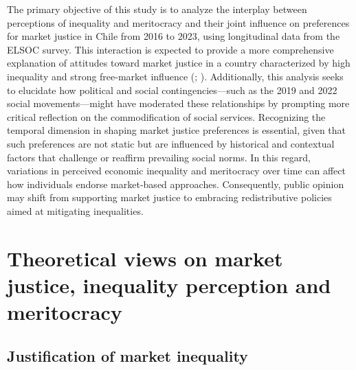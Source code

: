 \documentclass[
  12pt,
]{article}
\begin{document}
The primary objective of this study is to analyze the interplay between
perceptions of inequality and meritocracy and their joint influence on
preferences for market justice in Chile from 2016 to 2023, using
longitudinal data from the ELSOC survey. This interaction is expected to
provide a more comprehensive explanation of attitudes toward market
justice in a country characterized by high inequality and strong
free-market influence (;
). Additionally, this
analysis seeks to elucidate how political and social
contingencies---such as the 2019 and 2022 social movements---might have
moderated these relationships by prompting more critical reflection on
the commodification of social services. Recognizing the temporal
dimension in shaping market justice preferences is essential, given that
such preferences are not static but are influenced by historical and
contextual factors that challenge or reaffirm prevailing social norms.
In this regard, variations in perceived economic inequality and
meritocracy over time can affect how individuals endorse market-based
approaches. Consequently, public opinion may shift from supporting
market justice to embracing redistributive policies aimed at mitigating
inequalities.

\section{Theoretical views on market justice, inequality perception and
meritocracy}\label{theoretical-views-on-market-justice-inequality-perception-and-meritocracy}

\subsection{Justification of market
inequality}\label{justification-of-market-inequality}
\end{document}
